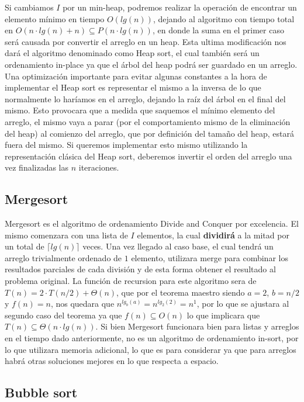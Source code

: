 \documentclass[10pt, a4paper]{report}
\begin{document}
Si cambiamos $I$ por un min-heap, podremos realizar la operaci\'on de encontrar un elemento m\'inimo en tiempo $O(lg(n))$, dejando al algoritmo con tiempo total en $O(n\cdot lg(n) + n) \subseteq P(n\cdot lg(n))$, en donde la suma en el primer caso ser\'a causada por convertir el arreglo en un heap. Esta ultima modificaci\'on nos dar\'a el algoritmo denominado como Heap sort, el cual tambi\'en ser\'a un ordenamiento in-place ya que el \'arbol del heap podr\'a ser guardado en un arreglo. Una optimizaci\'on importante para evitar algunas constantes a la hora de implementar el Heap sort es representar el mismo a la inversa de lo que normalmente lo har\'iamos en el arreglo, dejando la ra\'iz del \'arbol en el final del mismo. Esto provocara que a medida que saquemos el m\'inimo elemento del arreglo, el mismo vaya a parar (por el comportamiento mismo de la eliminaci\'on del heap) al comienzo del arreglo, que por definici\'on del tama\~no del heap, estar\'a fuera del mismo. Si queremos implementar esto mismo 
utilizando la representaci\'on cl\'asica del Heap sort, deberemos invertir el orden del arreglo una vez finalizadas las $n$ iteraciones.

\subsection{Mergesort}

Mergesort es el algoritmo de ordenamiento Divide and Conquer por excelencia. El mismo comenzara con una lista de $I$ elementos, la cual \textbf{dividir\'a} a la mitad por un total de $\lceil lg(n) \rceil$ veces. Una vez llegado al caso base, el cual tendr\'a un arreglo trivialmente ordenado de $1$ elemento, utilizara merge para combinar los resultados parciales de cada divisi\'on y de esta forma obtener el resultado al problema original. La funci\'on de recursion para este algoritmo sera de $T(n) = 2 \cdot T(n/2) + \Theta(n)$, que por el teorema maestro siendo $a=2$, $b=n/2$ y $f(n) = n$, nos quedara que $n^{lg_b(a)} = n^{lg_2(2)} = n^1$, por lo que se ajustara al segundo caso del teorema ya que $f(n) \subseteq O(n)$ lo que implicara que $T(n) \subseteq \Theta(n \cdot lg(n))$. Si bien Mergesort funcionara bien para listas y arreglos en el tiempo dado anteriormente, no es un algoritmo de ordenamiento in-sort, por lo que utilizara memoria adicional, lo que es para considerar ya que para arreglos habr\'a otras 
soluciones 
mejores en lo que respecta a espacio.

\subsection{Bubble sort}
\end{document}
